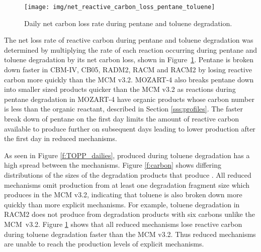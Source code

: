 %
\begin{figure}
    \centering
    \texttt{[image: img/net\_reactive\_carbon\_loss\_pentane\_toluene]}
    \vspace{0mm}
    \caption{Daily net carbon loss rate during pentane and toluene degradation.}
    \vspace{-4mm}
    \label{f:net_carbon_loss}
\end{figure}
%
The net loss rate of reactive carbon during pentane and toluene degradation was determined by multiplying the rate of each reaction occurring during pentane and toluene degradation by its net carbon loss, shown in \mbox{Figure \ref{f:net_carbon_loss}}.
Pentane is broken down faster in CBM-IV, CB05, RADM2, RACM and RACM2 by losing reactive carbon more quickly than the MCM v3.2.
MOZART-4 also breaks pentane down into smaller sized products quicker than the MCM v3.2 as reactions during pentane degradation in MOZART-4 have organic products whose carbon number is less than the organic reactant, described in Section \ref{sss:profiles}.
The faster break down of pentane on the first day limits the amount of reactive carbon available to produce further  on subsequent days leading to lower  production after the first day in reduced mechanisms.

As seen in Figure \ref{f:TOPP_dailies},  produced during toluene degradation has a high spread between the mechanisms.
Figure \ref{f:carbon} shows differing distributions of the sizes of the degradation products that produce .
All reduced mechanisms omit  production from at least one degradation fragment size which produces  in the MCM v3.2, indicating that toluene is also broken down more quickly than more explicit mechanisms.
For example, toluene degradation in RACM2 does not produce  from degradation products with six carbons unlike the \mbox{MCM v3.2}.  
Figure \ref{f:net_carbon_loss} shows that all reduced mechanisms lose reactive carbon during toluene degradation faster than the MCM v3.2.
Thus reduced mechanisms are unable to reach the  production levels of explicit mechanisms.
